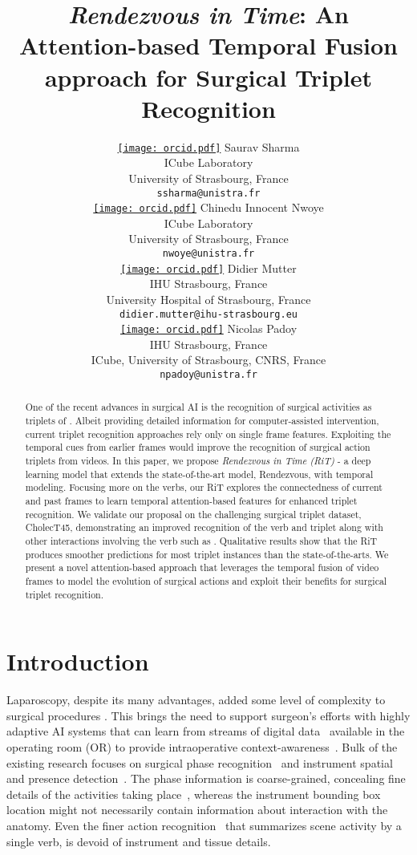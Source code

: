 \documentclass{article}
\title{\emph{Rendezvous in Time}: An Attention-based Temporal Fusion approach for Surgical Triplet Recognition}
\author{ 
        {
        \hspace{12mm}\href{https://orcid.org/0000-0002-6021-6132}{\texttt{[image: orcid.pdf]}} Saurav Sharma} \\
	{\hspace{14mm}ICube Laboratory}\\
	{\hspace{10mm}University of Strasbourg, France}\\
	{\hspace{14mm}\texttt{ssharma@unistra.fr}} \\
	\And
	{
        \hspace{23mm}\href{https://orcid.org/0000-0003-4777-0857}{\texttt{[image: orcid.pdf]}} Chinedu Innocent Nwoye} \\
	{\hspace{22mm}ICube Laboratory}\\
	{\hspace{22mm}University of Strasbourg, France}\\
	{\hspace{22mm}\texttt{nwoye@unistra.fr}}\\
	\And
        \And
 	{
         \hspace{1mm}\href{https://orcid.org/0000-0002-7559-3328}{\texttt{[image: orcid.pdf]}} Didier Mutter} \\
        IHU Strasbourg, France\\
        University Hospital of Strasbourg, France\\
	\texttt{didier.mutter@ihu-strasbourg.eu} \\
        \And
	{
        \hspace{1mm}\href{https://orcid.org/0000-0002-5010-4137}{\texttt{[image: orcid.pdf]}} Nicolas Padoy} \\
        IHU Strasbourg, France\\
        ICube, University of Strasbourg, CNRS, France\\
	\texttt{npadoy@unistra.fr} \\
}
\date{}
\begin{document}
\maketitle


\begin{abstract}
One of the recent advances in surgical AI is the recognition of surgical activities as triplets of \textrangle{}. Albeit providing detailed information for computer-assisted intervention, current triplet recognition approaches rely only on single frame features. Exploiting the temporal cues from earlier frames would improve the recognition of surgical action triplets from videos.
In this paper, we propose \emph{Rendezvous in Time (RiT)} - a deep learning model that extends the state-of-the-art model, Rendezvous, with temporal modeling.
Focusing more on the verbs, our RiT explores the connectedness of current and past frames to learn temporal attention-based features for enhanced triplet recognition.
We validate our proposal on the challenging surgical triplet dataset, CholecT45, demonstrating an improved recognition of the verb and triplet along with other interactions involving the verb such as \textrangle{}. Qualitative results show that the RiT produces smoother predictions for most triplet instances than the state-of-the-arts.
We present a novel attention-based approach that leverages the temporal fusion of video frames to model the evolution of surgical actions and exploit their benefits for surgical triplet recognition.
\end{abstract}


\section{Introduction}
Laparoscopy, despite its many advantages, added some level of complexity to surgical procedures \cite{cai4cai}. This brings the need to support surgeon's efforts with highly adaptive AI systems that can learn from streams of digital data~\cite{surgicalds} available in the operating room (OR) to provide intraoperative context-awareness~\cite{cai4cai}.
Bulk of the existing research focuses on surgical phase recognition~\cite{endonet} and instrument spatial and presence detection~\cite{jin2018tool}.
The phase information is coarse-grained, concealing fine details of the activities taking place~\cite{nwoye2021deep}, whereas the instrument bounding box location might not necessarily contain information about interaction with the anatomy.
Even the finer action recognition~\cite{wagner2021comparative} that summarizes scene activity by a single verb, is devoid of instrument and tissue details.
\end{document}
